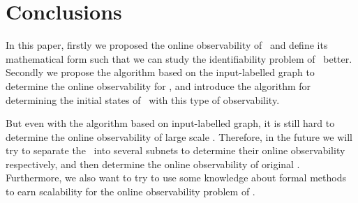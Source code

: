 \section{Conclusions}
\label{sec:con}
In this paper, firstly we proposed the online observability of \BCNs\ and define its mathematical form such that we can study the identifiability problem of \BCNs\ better. Secondly we propose the algorithm based on the input-labelled graph to determine the online observability for \BCNs, and introduce the algorithm for determining the initial states of \BCNs\ with this type of observability. %


But even with the algorithm based on input-labelled graph, it is still hard to determine the online observability of large scale \BCNs. Therefore, in the future we will try to separate the \BCN\ into several subnets to determine their online observability respectively, and then determine the online observability of original \BCN. Furthermore, we also want to try to use some knowledge about formal methods to earn scalability for the online observability problem of \BCNs. 

